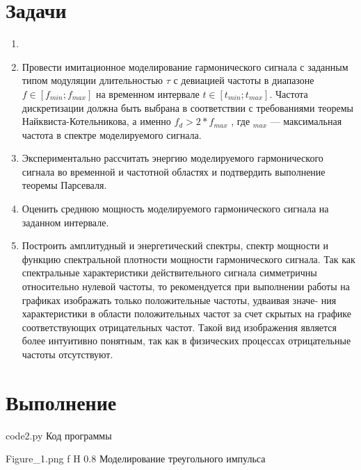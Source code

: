 \documentclass{bmstu}
\begin{document}
\section*{Задачи}
\begin{enumerate}
\item {}
\item Провести имитационное моделирование гармонического сигнала с заданным
типом модуляции длительностью $\tau$ с девиацией частоты в диапазоне $f \in
[f_{min} ; f_{max} ]$ на временном интервале $t \in [t_{min} ; t_{max} ]$. 
Частота дискретизации должна быть выбрана в соответствии с требованиями теоремы Найквиста-Котельникова, а именно $f_d > 2*f_{max}$ , где $_{max}$ ---
максимальная частота в спектре моделируемого сигнала.
\item Экспериментально рассчитать энергию моделируемого гармонического сигнала во временной и частотной областях и подтвердить выполнение теоремы Парсеваля.
\item Оценить среднюю мощность моделируемого гармонического сигнала на заданном интервале.
\item Построить амплитудный и энергетический спектры, спектр мощности и
функцию спектральной плотности мощности гармонического сигнала. Так
как спектральные характеристики действительного сигнала симметричны
относительно нулевой частоты, то рекомендуется при выполнении работы
на графиках изображать только положительные частоты, удваивая значе-
ния характеристики в области положительных частот за счет скрытых на
графике соответствующих отрицательных частот. Такой вид изображения
является более интуитивно понятным, так как в физических процессах
отрицательные частоты отсутствуют.

\end{enumerate}

\section*{Выполнение}

	{code2.py}
	{Код программы}

    {Figure_1.png} %
    {f} %
    {H} %
    {0.8\textwidth} %
    {Моделирование треугольного импульса} %
\end{document}
